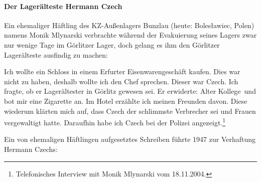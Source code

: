 \paragraph{Der Lagerälteste Hermann Czech\label{czech_ahndung}} 
Ein ehemaliger Häftling des KZ-Außenlagers Bunzlau (heute: Boles\l awiec, Polen) namens Monik Mlynarski verbrachte während der Evakuierung seines Lagers zwar nur wenige Tage im Görlitzer Lager, doch gelang es ihm den Görlitzer Lagerälteste ausfindig zu machen:
\begin{leftbar} 
Ich wollte ein Schloss in einem Erfurter Eisenwarengeschäft kaufen. Dies war nicht zu haben, deshalb wollte ich den Chef sprechen. Dieser war Czech. Ich fragte, ob er Lagerältester in Görlitz gewesen sei. Er erwiderte: \glqq Alter Kollege\grqq~und bot mir eine Zigarette an. Im Hotel erzählte ich meinen Freunden davon. Diese wiederum klärten mich auf, dass Czech der schlimmste Verbrecher sei und Frauen vergewaltigt hatte. Daraufhin habe ich Czech bei der Polizei angezeigt.\footnote{Telefonisches Interview mit Monik Mlynarski vom 18.11.2004.}
\end{leftbar}

Ein von ehemaligen Häftlingen aufgesetztes Schreiben führte 1947 zur Verhaftung Hermann Czechs:

